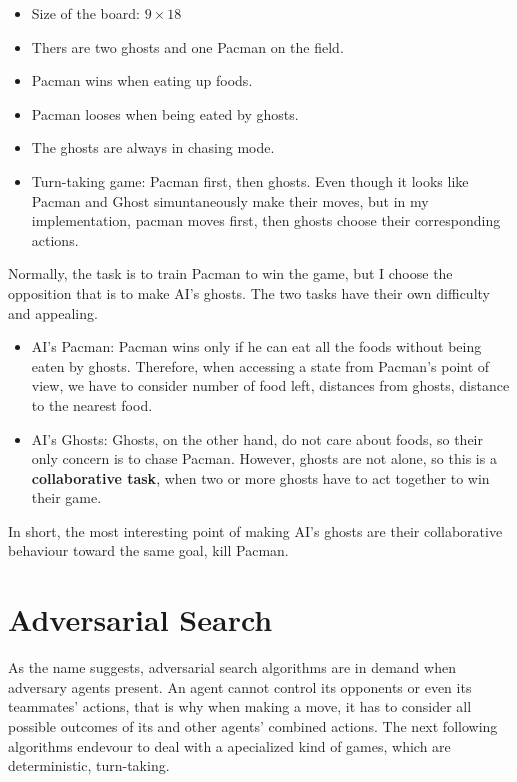 \documentclass[a4paper, 11pt]{article}
\begin{document}
\begin{itemize}
\item Size of the board: $9\times 18$
\item Thers are two ghosts and one Pacman on the field.
\item Pacman wins when eating up foods.
\item Pacman looses when being eated by ghosts.
\item The ghosts are always in chasing mode.
\item Turn-taking game: Pacman first, then ghosts. Even though it looks like Pacman and Ghost simuntaneously make their moves, but in my implementation, pacman moves first, then ghosts choose their corresponding actions.
\end{itemize}
Normally, the task is to train Pacman to win the game, but I choose the opposition that is to make AI's ghosts. The two tasks have their own difficulty and appealing. 
\begin{itemize} 
\item AI's Pacman: Pacman wins only if he can eat all the foods without being eaten by ghosts. Therefore, when accessing a state from Pacman's point of view, we have to consider number of food left, distances from ghosts, distance to the nearest food.
\item AI's Ghosts: Ghosts, on the other hand, do not care about foods, so their only concern is to chase Pacman. However, ghosts are not alone, so this is a \textbf{collaborative task}, when two or more ghosts have to act together to win their game.
\end{itemize}
In short, the most interesting point of making AI's ghosts are their collaborative behaviour toward the same goal, kill Pacman.
\section{Adversarial Search}
As the name suggests, adversarial search algorithms are in demand when adversary agents present. An agent cannot control its opponents or even its teammates' actions, that is why when making a move, it has to consider all possible outcomes of its and other agents' combined actions. The next following algorithms endevour to deal with a apecialized kind of games, which are deterministic, turn-taking. 
\end{document}
